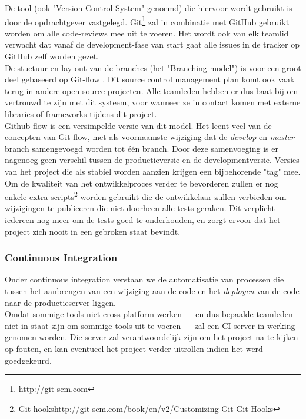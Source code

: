De tool (ook "Version Control System" genoemd) die hiervoor wordt gebruikt is door de opdrachtgever vastgelegd. Git\footnote{http://git-scm.com} zal in combinatie met GitHub \cite{GitHub} gebruikt worden om alle code-reviews mee uit te voeren. Het wordt ook van elk teamlid verwacht dat vanaf de development-fase van start gaat alle issues in de tracker op GitHub zelf worden gezet. \\

De stuctuur en lay-out van de branches (het "Branching model") is voor een groot deel gebaseerd op Git-flow \cite{GitFlow}. Dit source control management plan komt ook vaak terug in andere open-source projecten. Alle teamleden hebben er dus baat bij om vertrouwd te zijn met dit systeem, voor wanneer ze in contact komen met externe libraries of frameworks tijdens dit project. \\

Github-flow \cite{GitHubFlow} is een versimpelde versie van dit model. Het leent veel van de concepten van Git-flow, met als voornaamste wijziging dat de \textit{develop} en \textit{master}-branch samengevoegd worden tot één branch. Door deze samenvoeging is er nagenoeg geen verschil tussen de productieversie en de developmentversie. Versies van het project die als stabiel worden aanzien krijgen een bijbehorende "tag" mee. \\

Om de kwaliteit van het ontwikkelproces verder te bevorderen zullen er nog enkele extra scripts\footnote{\url{Git-hooks}{http://git-scm.com/book/en/v2/Customizing-Git-Git-Hooks}} worden gebruikt  die de ontwikkelaar zullen verbieden om wijzigingen te publiceren die niet doorheen alle tests geraken. Dit verplicht iedereen nog meer om de tests goed te onderhouden, en zorgt ervoor dat het project zich nooit in een gebroken staat bevindt.

\subsubsection{Continuous Integration}

Onder continuous integration verstaan we de automatisatie van processen die tussen het aanbrengen van een wijziging aan de code en het \textit{deployen} van de code naar de productieserver liggen. \\

Omdat sommige tools niet cross-platform werken --- en dus bepaalde teamleden niet in staat zijn om sommige tools uit te voeren --- zal een CI-server in werking genomen worden. Die server zal verantwoordelijk zijn om het project na te kijken op fouten, en kan eventueel het project verder uitrollen indien het werd goedgekeurd. \\

